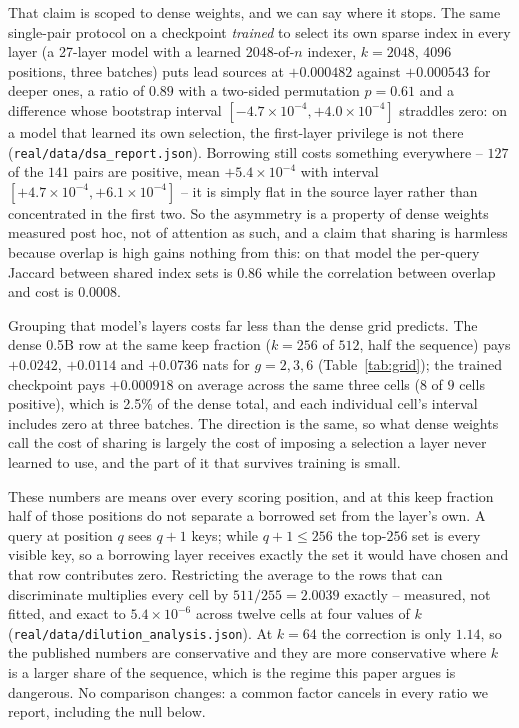 \documentclass[10pt]{article}
\begin{document}
That claim is scoped to dense weights, and we can say where it stops. The same
single-pair protocol on a checkpoint \emph{trained} to select its own sparse
index in every layer (a 27-layer model with a learned 2048-of-$n$ indexer,
$k{=}2048$, 4096 positions, three batches) puts lead sources at $+0.000482$
against $+0.000543$ for deeper ones, a ratio of $0.89$ with a two-sided
permutation $p=0.61$ and a difference whose bootstrap interval
$[-4.7\times10^{-4}, +4.0\times10^{-4}]$ straddles zero: on a model that
learned its own selection, the first-layer privilege is not there
(\texttt{real/data/dsa\_report.json}). Borrowing still costs something
everywhere -- $127$ of the $141$ pairs are positive, mean
$+5.4\times10^{-4}$ with interval $[+4.7\times10^{-4}, +6.1\times10^{-4}]$
-- it is simply flat in the source layer rather than concentrated in the first
two. So the asymmetry is a property of dense weights measured post hoc, not of
attention as such, and a claim that sharing is harmless because overlap is high
gains nothing from this: on that model the per-query Jaccard between shared
index sets is $0.86$ while the correlation between overlap and cost is
$0.0008$.

Grouping that model's layers costs far less than the dense grid predicts. The
dense 0.5B row at the same keep fraction ($k{=}256$ of $512$, half the sequence) pays
$+0.0242$, $+0.0114$ and $+0.0736$ nats for $g{=}2,3,6$
(Table~\ref{tab:grid}); the trained checkpoint pays $+0.000918$ on average
across the same three cells ($8$ of $9$ cells positive), which is 2.5\% of
the dense total, and each individual cell's interval includes zero at three
batches. The direction is the same, so what dense weights call the cost of
sharing is largely the cost of imposing a selection a layer never learned to
use, and the part of it that survives training is small.

These numbers are means over every scoring position, and at this keep fraction
half of those positions do not separate a borrowed set from the layer's own. A query at position $q$ sees $q+1$
keys; while $q+1 \le 256$ the top-$256$ set is every visible key, so a borrowing
layer receives exactly the set it would have chosen and that row contributes
zero. Restricting the average to the rows that can discriminate multiplies every
cell by $511/255 = 2.0039$ exactly -- measured, not fitted, and exact to
$5.4\times10^{-6}$ across twelve cells at four values of $k$
(\texttt{real/data/dilution\_analysis.json}). At $k{=}64$ the correction is only
$1.14$, so the published numbers are conservative and they are more conservative
where $k$ is a larger share of the sequence, which is the regime this paper
argues is dangerous. No comparison changes: a common factor cancels in every
ratio we report, including the null below.
\end{document}
